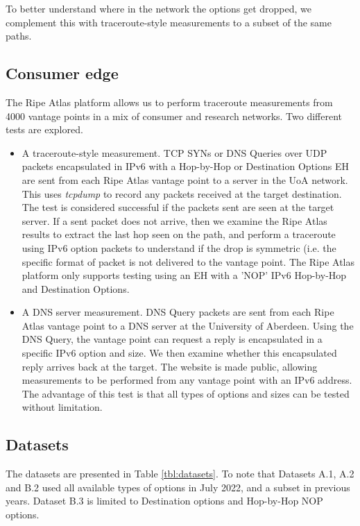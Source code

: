 \documentclass[conference]{IEEEtran}
\begin{document}
To better understand where in the network the options get dropped, we complement this with traceroute-style measurements to a subset of the same paths.

\subsection{Consumer edge}
\label{sec:consumer-edge}

The Ripe Atlas platform allows us to perform traceroute measurements from 4000 vantage points in a mix of consumer and research networks.
Two different tests are explored.

\begin{itemize}

\item A traceroute-style measurement.  TCP SYNs or DNS Queries over UDP packets encapsulated in IPv6 with a Hop-by-Hop or Destination Options EH are sent from each Ripe Atlas vantage point to a server in
the UoA network. This uses \textit{tcpdump} to record any packets received at the target destination. The test is considered successful if the packets sent are seen at the target server. If a sent packet does not arrive, then we examine the Ripe Atlas results to extract the last hop seen on the path, and perform a traceroute using IPv6 option packets to understand if the drop is symmetric (i.e. the specific format of packet is not delivered to the vantage point. 
The Ripe Atlas platform only supports testing using an EH with a 'NOP' IPv6 Hop-by-Hop and Destination Options.


\item A DNS server measurement. DNS Query packets are sent from each Ripe Atlas vantage point to a DNS server at the University of Aberdeen. Using the DNS Query, the vantage point can request a reply is encapsulated in a specific IPv6 option and size. We then examine whether this encapsulated reply arrives back at the target. The website is made public, allowing measurements to be performed from any vantage point with an IPv6 address.
The advantage of this test is that all types of options and sizes can be tested without limitation.

\end{itemize}


\subsection{Datasets} 
\label{sec:datasets}

The datasets are presented in Table \ref{tbl:datasets}. To note that Datasets A.1, A.2 and B.2 used all available types of options in July 2022, and a subset in previous years.
Dataset B.3 is limited to Destination options and Hop-by-Hop NOP options.
\end{document}
